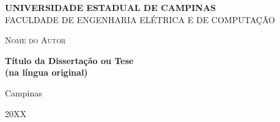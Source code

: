 \begin{center}

%
\parbox[b]{\textwidth}{\centering\sffamily%
{\bfseries\fontsize{15.5pt}{1em}\selectfont\uppercase{Universidade Estadual de Campinas}}\\
\fontsize{11.3pt}{1.2em}\selectfont\uppercase{Faculdade de Engenharia Elétrica e de Computação}}

\vskip 5cm

{\large\scshape Nome do Autor\par}

\vskip 4cm

{\LARGE\bfseries Título da Dissertação ou Tese\\(na língua original)\par}

%

\vfill

Campinas

20XX

\end{center}
